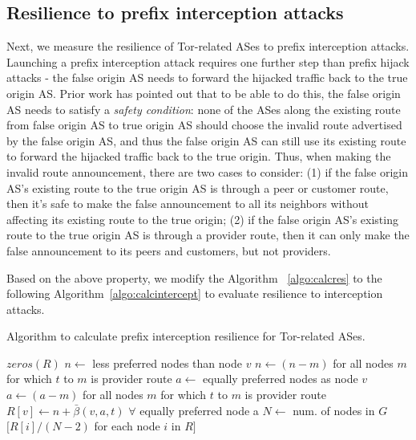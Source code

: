 \subsection{Resilience to prefix interception attacks}
\label{interception_methodology}
Next, we measure the resilience of Tor-related ASes to prefix interception attacks. Launching a prefix interception attack requires one further step than prefix hijack attacks - the false origin AS needs to forward the hijacked traffic back to the true origin AS. Prior work \cite{ballani2007study, pilosov16stealing} has pointed out that to be able to do this, the false origin AS needs to satisfy a \emph{safety condition}: none of the ASes along the existing route from false origin AS to true origin AS should choose the invalid route advertised by the false origin AS, and thus the false origin AS can still use its existing route to forward the hijacked traffic back to the true origin. Thus, when making the invalid route announcement, there are two cases to consider: (1) if the false origin AS's existing route to the true origin AS is through a peer or customer route, then it's safe to make the false announcement to all its neighbors without affecting its existing route to the true origin; (2) if the false origin AS's existing route to the true origin AS is through a provider route, then it can only make the false announcement to its peers and customers, but not providers. 

Based on the above property, we modify the Algorithm ~\ref{algo:calcres} to the following Algorithm~\ref{algo:calcintercept} to evaluate resilience to interception attacks. 

\begin{algorithm}
\caption{Algorithm to calculate prefix interception resilience for Tor-related ASes.}
\label{algo:calcintercept}
\begin{algorithmic}
    \State {}
    \State $zeros(R)$
		\State $n \gets$ less preferred nodes than node $v$
			\State $n \gets (n - m)$ for all nodes $m$ for which $t$ to $m$ is provider route
		\EndIf
		\State $a \gets$ equally preferred nodes as node $v$
			\State $a \gets (a - m)$ for all nodes $m$ for which $t$ to $m$ is provider route
		\EndIf
		\State $R[v] \gets n + \bar{\beta}(v,a,t)$ $\forall$ equally preferred node a
	\EndIf
    \EndFor
    \State $N \gets$ num. of nodes in $G$
    \State \Return $[R[i] / (N-2)$ for each node $i$ in $R]$
\EndFunction
\end{algorithmic}
\end{algorithm}

